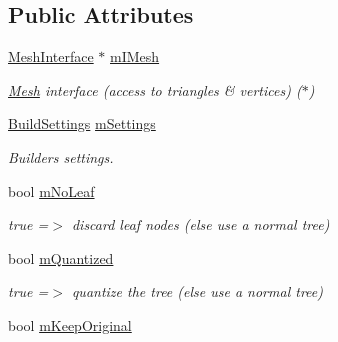 \subsection*{Public Attributes}
\begin{DoxyCompactItemize}
\item 
\hyperlink{classOpcode_1_1MeshInterface}{Mesh\+Interface} $\ast$ \hyperlink{structOpcode_1_1OPCODECREATE_a5622c9dc20b395a6600393236deab77d}{m\+I\+Mesh}\hypertarget{structOpcode_1_1OPCODECREATE_a5622c9dc20b395a6600393236deab77d}{}\label{structOpcode_1_1OPCODECREATE_a5622c9dc20b395a6600393236deab77d}

\begin{DoxyCompactList}\small\item\em \hyperlink{classMesh}{Mesh} interface (access to triangles \& vertices) ($\ast$) \end{DoxyCompactList}\item 
\hyperlink{structOpcode_1_1BuildSettings}{Build\+Settings} \hyperlink{structOpcode_1_1OPCODECREATE_a4c96b4dae6836d7a197b19f24c25d018}{m\+Settings}\hypertarget{structOpcode_1_1OPCODECREATE_a4c96b4dae6836d7a197b19f24c25d018}{}\label{structOpcode_1_1OPCODECREATE_a4c96b4dae6836d7a197b19f24c25d018}

\begin{DoxyCompactList}\small\item\em Builder\textquotesingle{}s settings. \end{DoxyCompactList}\item 
bool \hyperlink{structOpcode_1_1OPCODECREATE_a865b10331d997bfd511676d75e52b35a}{m\+No\+Leaf}\hypertarget{structOpcode_1_1OPCODECREATE_a865b10331d997bfd511676d75e52b35a}{}\label{structOpcode_1_1OPCODECREATE_a865b10331d997bfd511676d75e52b35a}

\begin{DoxyCompactList}\small\item\em true =$>$ discard leaf nodes (else use a normal tree) \end{DoxyCompactList}\item 
bool \hyperlink{structOpcode_1_1OPCODECREATE_aafc09be81090b1b67b6e11c2dc3058c3}{m\+Quantized}\hypertarget{structOpcode_1_1OPCODECREATE_aafc09be81090b1b67b6e11c2dc3058c3}{}\label{structOpcode_1_1OPCODECREATE_aafc09be81090b1b67b6e11c2dc3058c3}

\begin{DoxyCompactList}\small\item\em true =$>$ quantize the tree (else use a normal tree) \end{DoxyCompactList}\item 
bool \hyperlink{structOpcode_1_1OPCODECREATE_a5550d239a97227a4a96b169a787c8cc8}{m\+Keep\+Original}\hypertarget{structOpcode_1_1OPCODECREATE_a5550d239a97227a4a96b169a787c8cc8}{}\label{structOpcode_1_1OPCODECREATE_a5550d239a97227a4a96b169a787c8cc8}


\end{DoxyCompactItemize}
